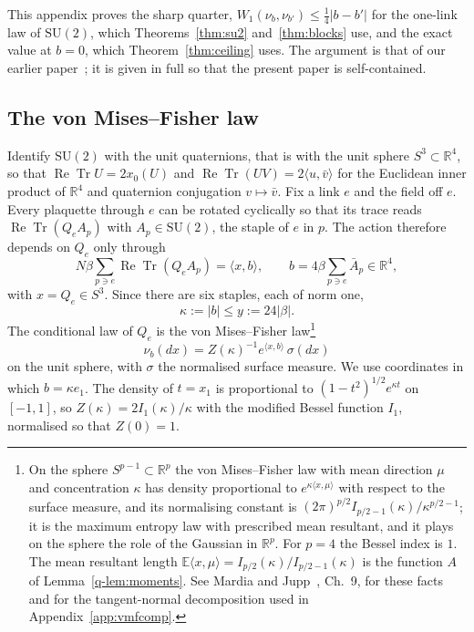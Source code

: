 \documentclass[aps,prd,twocolumn,superscriptaddress,nofootinbib,longbibliography,floatfix,amsmath,amssymb,10pt]{revtex4-2}
\theoremstyle{definition}
\theoremstyle{remark}
\newcommand{\R}{\mathbb{R}}
\newcommand{\E}{\mathbb{E}}
\newcommand{\SU}{\mathrm{SU}}
\newcommand{\ReTr}{\operatorname{Re}\operatorname{Tr}}
\newcommand{\ip}[2]{\langle #1,#2\rangle}
\begin{document}
This appendix proves the sharp quarter, $W_1(\nu_b,\nu_{b'})\le\frac14|b-b'|$
for the one-link law of $\SU(2)$, which Theorems~\ref{thm:su2}
and~\ref{thm:blocks} use, and the exact value at $b=0$, which
Theorem~\ref{thm:ceiling} uses. The argument is that of our earlier
paper~\cite{BB26a}; it is given in full so that the present paper is
self-contained.

\subsection{The von Mises--Fisher law}

Identify $\SU(2)$ with the unit quaternions, that is with the unit sphere
$S^3\subset\R^4$, so that $\ReTr U=2x_0(U)$ and $\ReTr(UV)=2\ip u{\bar v}$
for the Euclidean inner product of $\R^4$ and quaternion conjugation
$v\mapsto\bar v$. Fix a link $e$ and the field off $e$. Every plaquette
through $e$ can be rotated cyclically so that its trace reads $\ReTr(Q_eA_p)$
with $A_p\in\SU(2)$, the staple of $e$ in $p$. The action therefore depends on
$Q_e$ only through
\[
N\beta\sum_{p\ni e}\ReTr(Q_eA_p)=\ip{x}{b},\qquad
b=4\beta\sum_{p\ni e}\bar A_p\in\R^4,
\]
with $x=Q_e\in S^3$. Since there are six staples, each of norm one,
\begin{equation}\label{q-eq:kappamax}
\kappa:=|b|\le y:=24|\beta| .
\end{equation}
The conditional law of $Q_e$ is the von Mises--Fisher law\footnote{On the
sphere $S^{p-1}\subset\R^p$ the von Mises--Fisher law with mean direction
$\mu$ and concentration $\kappa$ has density proportional to
$e^{\kappa\ip x\mu}$ with respect to the surface measure, and its normalising
constant is $(2\pi)^{p/2}I_{p/2-1}(\kappa)/\kappa^{p/2-1}$; it is the maximum
entropy law with prescribed mean resultant, and it plays on the sphere the
role of the Gaussian in $\R^p$. For $p=4$ the Bessel index is $1$. The mean
resultant length $\E\ip x\mu=I_{p/2}(\kappa)/I_{p/2-1}(\kappa)$ is the
function $A$ of Lemma~\ref{q-lem:moments}. See Mardia and Jupp~\cite{MJ00},
Ch.~9, for these facts and for the tangent-normal decomposition used in
Appendix~\ref{app:vmfcomp}.}
\begin{equation}\label{q-eq:vmf}
\nu_b(dx)=Z(\kappa)^{-1}e^{\ip xb}\,\sigma(dx)
\end{equation}
on the unit sphere, with $\sigma$ the normalised surface measure. We use
coordinates in which $b=\kappa e_1$. The density of $t=x_1$ is proportional
to $(1-t^2)^{1/2}e^{\kappa t}$ on $[-1,1]$, so $Z(\kappa)=2I_1(\kappa)/\kappa$
with the modified Bessel function $I_1$, normalised so that $Z(0)=1$.
\end{document}
